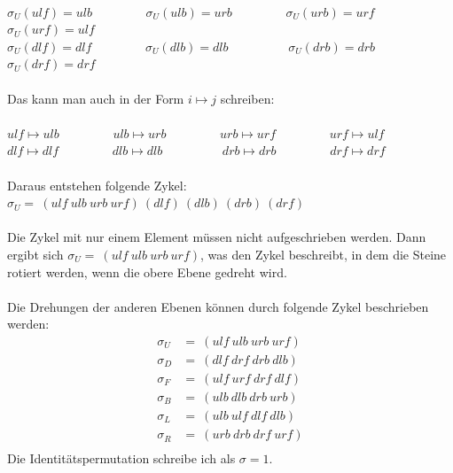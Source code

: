 \documentclass[12pt,a4paper, usenames, dvipsnames]{scrartcl}
\begin{document}
\ \\
$\sigma_U(ulf)=ulb$ \ \ \ \ \ \ \ \ $\sigma_U(ulb)=urb$ \ \ \ \ \ \ \ \ $\sigma_U(urb)=urf$ \ \ \ \ \ \ \ \ $\sigma_U(urf)=ulf$ \\
$\sigma_U(dlf)=dlf$ \ \ \ \ \ \ \ \ $\sigma_U(dlb)=dlb$ \ \ \ \ \ \ \ \ \ $\sigma_U(drb)=drb$ \ \ \ \ \ \ \ \ $\sigma_U(drf)=drf$ \\
\\
Das kann man auch in der Form $i \mapsto j$ schreiben: \\
\\
$ulf \mapsto ulb$ \ \ \ \ \ \ \ \ $ulb \mapsto urb$ \ \ \ \ \ \ \ \ $urb \mapsto urf$ \ \ \ \ \ \ \ \ $urf \mapsto ulf$ \\
$dlf \mapsto dlf$ \ \ \ \ \ \ \ \ $dlb \mapsto dlb$ \ \ \ \ \ \ \ \ \ $drb \mapsto drb$ \ \ \ \ \ \ \ \ $drf \mapsto drf$ \\
\\
Daraus entstehen folgende Zykel: $\sigma_U = \ (ulf \ ulb \ urb \ urf)\ (dlf)\ (dlb)\ (drb)\ (drf)$ \\ \\
Die Zykel mit nur einem Element müssen nicht aufgeschrieben werden. Dann ergibt sich $\sigma_U = \ (ulf \ ulb \ urb \ urf)$, was den Zykel beschreibt, in dem die Steine rotiert werden, wenn die obere Ebene gedreht wird. \\
\\
Die Drehungen der anderen Ebenen können durch folgende Zykel beschrieben werden: \\
\begin{align*}
\sigma_U & =\ (ulf \ ulb \ urb \ urf) \\
\sigma_D & =\ (dlf \ drf \ drb \ dlb) \\
\sigma_F & =\ (ulf \ urf \ drf \ dlf) \\
\sigma_B & =\ (ulb \ dlb \ drb \ urb) \\
\sigma_L & =\ (ulb \ ulf \ dlf \ dlb) \\
\sigma_R & =\ (urb \ drb \ drf \ urf) \\
\end{align*}
Die Identitätspermutation schreibe ich als $\sigma = 1$.










\end{document}
